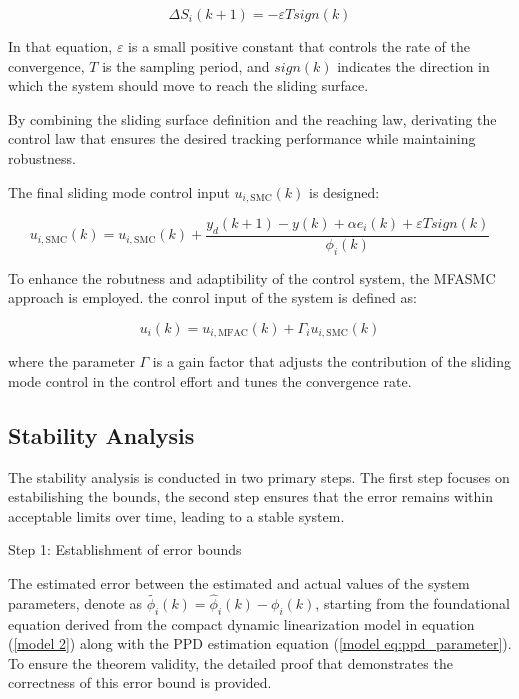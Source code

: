 \documentclass[journal,onecolumn]{IEEEtran}
\begin{document}
\begin{equation}
    \label{model eq:reaching_law}
    \Delta S_i(k+1) = - \varepsilon T sign(k) 
\end{equation}

In that equation, \(\varepsilon\) is a small positive constant that controls the rate of the convergence, \(T\) is the sampling period, and \(sign(k)\) indicates the direction in which the system should move to reach the sliding surface.

By combining the sliding surface definition and the reaching law, derivating the control law that ensures the desired tracking performance while maintaining robustness.

The final sliding mode control input \(u_{i,\text{SMC}}(k)\) is designed:

\begin{equation}
    \label{model eq:smc}
    u_{i,\text{SMC}}(k) = u_{i,\text{SMC}}(k) + \frac{y_d(k+1)-y(k) + \alpha e_i(k) + \varepsilon T sign(k)}{\phi_i(k)}
\end{equation}

To enhance the robutness and adaptibility of the control system, the MFASMC approach is employed.  the conrol input of the system is defined as:

\begin{equation}
    \label{model eq:mfasmc}
    u_i(k) = u_{i,\text{MFAC}}(k) + \Gamma_i  u_{i,\text{SMC}}(k)
\end{equation}

where the parameter \(\Gamma\) is a gain factor that adjusts the contribution of the sliding mode control in the control effort and tunes the convergence rate.

\subsection{Stability Analysis}

The stability analysis is conducted in two primary steps. The first step focuses on estabilishing the bounds, the second step ensures that the error remains within acceptable limits over time, leading to a stable system.

Step 1: Establishment of error bounds

The estimated error between the estimated and actual values of the system parameters, denote as \(\tilde{\phi_i}(k)
=\hat{\phi}_i(k)-\phi_i(k) \), starting from the foundational equation derived from the compact dynamic linearization model in equation (\ref{model 2}) along with the PPD estimation equation (\ref{model eq:ppd_parameter}). To ensure the theorem validity, the detailed proof that demonstrates the correctness of this error bound is provided.
\end{document}
